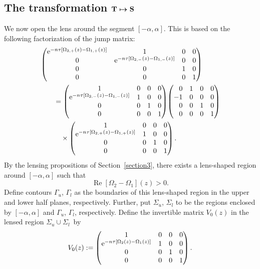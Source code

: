 \documentclass[pdftex]{sigma}
\numberwithin{equation}{section}
\begin{document}
\subsection[The transformation ${\bf T} \mapsto {\bf S}$]{The transformation $\boldsymbol{{\bf T} \mapsto {\bf S}}$}
We now open the lens around the segment $[-\alpha,\alpha]$. This is based on the following factorization of the jump matrix:
\begin{align*}
 &\begin{pmatrix}
 {\rm e}^{-n\tau[\Omega_{2,+}(z)-\Omega_{1,+}(z)]} & 1 & 0 & 0 \\
 0 & {\rm e}^{-n\tau[\Omega_{2,-}(z)-\Omega_{1,-}(z)]} & 0 & 0\\
 0 & 0 & 1 & 0 \\
 0 & 0 & 0 & 1
 \end{pmatrix}\\
 &\qquad{}=\begin{pmatrix}
 1 & 0 & 0 & 0\\
 {\rm e}^{-n\tau[\Omega_{2,-}(z)-\Omega_{1,-}(z)]} & 1 & 0 & 0\\
 0 & 0 & 1 & 0 \\
 0 & 0 & 0 & 1
 \end{pmatrix}\!
 \begin{pmatrix}
 \hphantom{-} 0 & 1 & 0 & 0\\
 -1 & 0 & 0 & 0\\
 \hphantom{-} 0 & 0 & 1 & 0 \\
 \hphantom{-} 0 & 0 & 0 & 1
 \end{pmatrix}\\
 & \qquad\quad\times
 \begin{pmatrix}
 1 & 0 & 0 & 0\\
 {\rm e}^{-n\tau[\Omega_{2,+}(z)-\Omega_{1,+}(z)]} & 1 & 0 & 0\\
 0 & 0 & 1 & 0 \\
 0 & 0 & 0 & 1
 \end{pmatrix}.
\end{align*}
By the lensing propositions of Section~\ref{section3}, there exists a lens-shaped region around $[-\alpha,\alpha]$ such that \[
\operatorname{Re}[\Omega_2 -\Omega_1](z) >0.
\]
 Define contours $\Gamma_u$, $\Gamma_l$ as the boundaries of this lens-shaped region in the upper and lower half planes, respectively. Further, put $\Sigma_u$, $\Sigma_l$ to be the regions enclosed by $[-\alpha,\alpha]$ and $\Gamma_u$, $\Gamma_l$, respectively.
Define the invertible matrix $V_0(z)$ in the lensed region $\Sigma_u \cup \Sigma_l$~by
 \begin{equation*}
 V_0(z) := \begin{pmatrix}
 1 & 0 & 0 & 0\\
 {\rm e}^{-n\tau[\Omega_{2}(z)-\Omega_{1}(z)]} & 1 & 0 & 0\\
 0 & 0 & 1 & 0 \\
 0 & 0 & 0 & 1
 \end{pmatrix}.
 \end{equation*}
\end{document}
